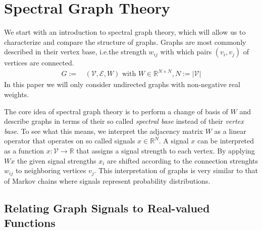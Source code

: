 \section{Spectral Graph Theory}%
\label{sec:sgt}

We start with an introduction to spectral graph theory, which will allow us to characterize and compare the structure of graphs.
Graphs are most commonly described in their vertex base, i.e.\@ the strength $w_{i j}$ with which pairs $(v_i, v_j)$ of vertices are connected.
\begin{align*}
	G :=&\, (\mathcal{V}, \mathcal{E}, W) \text{ with } W \in \mathbb{R}^{N \times N}, N := |\mathcal{V}|
\end{align*}
In this paper we will only consider undirected graphs with non-negative real weights.

The core idea of spectral graph theory is to perform a change of basis of $W$ and describe graphs in terms of their so called \textit{spectral base} instead of their \textit{vertex base}.
To see what this means, we interpret the adjacency matrix $W$ as a linear operator that operates on so called signals $x \in \mathbb{R}^N$.
A signal $x$ can be interpreted as a function $x: \mathcal{V} \to \mathbb{R}$ that assigns a signal strength to each vertex.
By applying $Wx$ the given signal strengths $x_i$ are shifted according to the connection strenghts $w_{i j}$ to neighboring vertices $v_j$.
This interpretation of graphs is very similar to that of Markov chains where signals represent probability distributions.

\subsection{Relating Graph Signals to Real-valued Functions}%
\label{sec:sgt:real}


